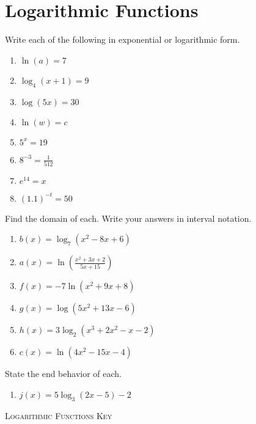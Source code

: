 \chapter{Logarithmic Functions}

Write each of the following in exponential or logarithmic form.
\begin{enumerate}
	\item $\ln(a) = 7$
    \item $\log_4 (x+1) = 9$
    \item $\log (5x) = 30$
    \item $\ln(w) = c$
    \item $5^x = 19$
    \item $8^{-3} = \frac{1}{512}$
    \item $e^{14} = x$
    \item $(1.1)^{-t} = 50$
\end{enumerate}	\setcounter{Review}{\value{enumi}}


Find the domain of each. Write your answers in interval notation.
\begin{enumerate}	\setcounter{enumi}{\value{Review}}
	\item $b(x) = \log_7\left(x^2 - 8x + 6\right)$
	\item $a(x) = \ln\left(\frac{x^2+3x+2}{5x+15}\right)$
	\item $f(x) = -7\ln\left(x^2 + 9x + 8\right)$
	\item $g(x) = \log\left(5x^2 + 13x - 6\right)$
	\item $h(x) = 3\log_2\left(x^3+2x^2-x-2\right)$
	\item $c(x) = \ln\left(4x^2 - 15x - 4\right)$
\end{enumerate}
\setcounter{Review}{\value{enumi}}

State the end behavior of each.
\begin{enumerate}	\setcounter{enumi}{\value{Review}}
	\item $j(x) = 5\log_3\left(2x-5\right) - 2$
\end{enumerate}

\newpage

\textsc{Logarithmic Functions Key}

